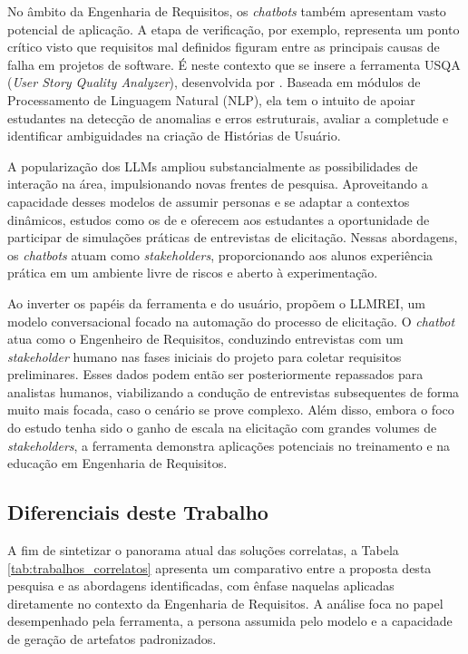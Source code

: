 No âmbito da Engenharia de Requisitos, os \textit{chatbots} também apresentam vasto potencial de aplicação. A etapa de verificação, por exemplo, representa um ponto crítico visto que requisitos mal definidos figuram entre as principais causas de falha em projetos de software. É neste contexto que se insere a ferramenta USQA (\textit{User Story Quality Analyzer}), desenvolvida por . Baseada em módulos de Processamento de Linguagem Natural (NLP), ela tem o intuito de apoiar estudantes na detecção de anomalias e erros estruturais, avaliar a completude e identificar ambiguidades na criação de Histórias de Usuário.

A popularização dos LLMs ampliou substancialmente as possibilidades de interação na área, impulsionando novas frentes de pesquisa. Aproveitando a capacidade desses modelos de assumir personas e se adaptar a contextos dinâmicos, estudos como os de  e  oferecem aos estudantes a oportunidade de participar de simulações práticas de entrevistas de elicitação. Nessas abordagens, os \textit{chatbots} atuam como \textit{stakeholders}, proporcionando aos alunos experiência prática em um ambiente livre de riscos e aberto à experimentação.

Ao inverter os papéis da ferramenta e do usuário,  propõem o LLMREI, um modelo conversacional focado na automação do processo de elicitação. O \textit{chatbot} atua como o Engenheiro de Requisitos, conduzindo entrevistas com um \textit{stakeholder} humano nas fases iniciais do projeto para coletar requisitos preliminares. Esses dados podem então ser posteriormente repassados para analistas humanos, viabilizando a condução de entrevistas subsequentes de forma muito mais focada, caso o cenário se prove complexo. Além disso, embora o foco do estudo tenha sido o ganho de escala na elicitação com grandes volumes de \textit{stakeholders}, a ferramenta demonstra aplicações potenciais no treinamento e na educação em Engenharia de Requisitos.

\subsection{Diferenciais deste Trabalho}

A fim de sintetizar o panorama atual das soluções correlatas, a Tabela \ref{tab:trabalhos_correlatos} apresenta um comparativo entre a proposta desta pesquisa e as abordagens identificadas, com ênfase naquelas aplicadas diretamente no contexto da Engenharia de Requisitos. A análise foca no papel desempenhado pela ferramenta, a persona assumida pelo modelo e a capacidade de geração de artefatos padronizados.

